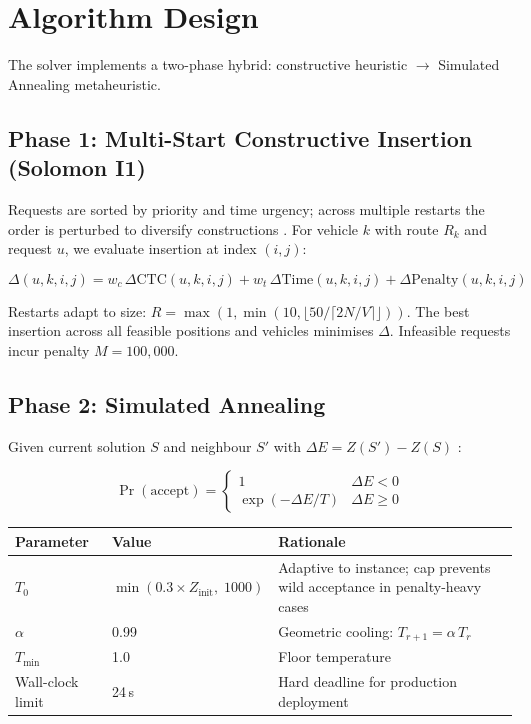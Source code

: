 \documentclass[11pt,a4paper]{article}
\begin{document}
\section{Algorithm Design}

The solver implements a two-phase hybrid: constructive heuristic $\to$ Simulated Annealing metaheuristic.

\subsection{Phase 1: Multi-Start Constructive Insertion (Solomon I1)}

Requests are sorted by priority and time urgency; across multiple restarts the order is perturbed to diversify constructions \cite{solomon1987,cordeau2002}. For vehicle $k$ with route $R_k$ and request $u$, we evaluate insertion at index $(i,j)$:

\begin{equation}
\Delta(u,k,i,j) = w_c\,\Delta\text{CTC}(u,k,i,j) + w_t\,\Delta\text{Time}(u,k,i,j) + \Delta\text{Penalty}(u,k,i,j)
\end{equation}

Restarts adapt to size: $R = \max(1,\min(10,\lfloor 50/\lceil 2N/V \rceil\rfloor))$. The best insertion across all feasible positions and vehicles minimises $\Delta$. Infeasible requests incur penalty $M = 100{,}000$.

\subsection{Phase 2: Simulated Annealing}

Given current solution $S$ and neighbour $S'$ with $\Delta E = Z(S') - Z(S)$ \cite{kirkpatrick1983}:

\begin{equation}
\Pr(\text{accept}) =
\begin{cases}
1 & \Delta E < 0 \\
\exp(-\Delta E / T) & \Delta E \ge 0
\end{cases}
\end{equation}

\begin{insightbox}
\small
\begin{tabular}{llp{7cm}}
\toprule
\textbf{Parameter} & \textbf{Value} & \textbf{Rationale} \\
\midrule
\rowcolor{rowalt}
$T_0$ & $\min(0.3 \times Z_{\text{init}},\; 1000)$ & Adaptive to instance; cap prevents wild acceptance in penalty-heavy cases \\
$\alpha$ & 0.99 & Geometric cooling: $T_{r+1} = \alpha\, T_r$ \\
\rowcolor{rowalt}
$T_{\min}$ & 1.0 & Floor temperature \\
Wall-clock limit & 24\,s & Hard deadline for production deployment \\
\bottomrule
\end{tabular}
\end{insightbox}
\end{document}
